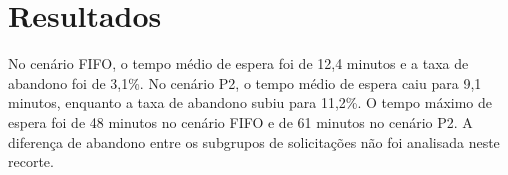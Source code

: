 \section{Resultados}
No cenário FIFO, o tempo médio de espera foi de 12,4 minutos e a taxa de abandono foi de 3,1\%.
No cenário P2, o tempo médio de espera caiu para 9,1 minutos, enquanto a taxa de abandono subiu para 11,2\%.
O tempo máximo de espera foi de 48 minutos no cenário FIFO e de 61 minutos no cenário P2.
A diferença de abandono entre os subgrupos de solicitações não foi analisada neste recorte.
